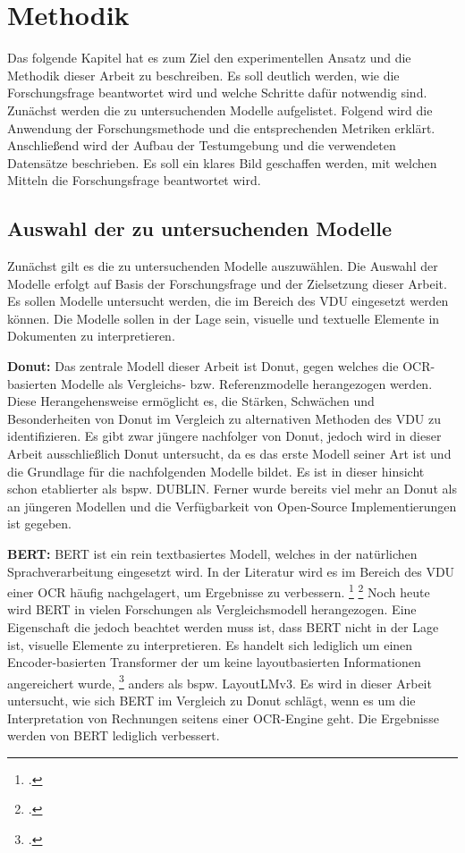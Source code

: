 \chapter{Methodik}
Das folgende Kapitel hat es zum Ziel den experimentellen Ansatz und die Methodik dieser Arbeit zu beschreiben. Es soll deutlich werden, wie die Forschungsfrage beantwortet wird und welche Schritte dafür notwendig sind. Zunächst werden die zu untersuchenden Modelle aufgelistet. Folgend wird die Anwendung der Forschungsmethode und die entsprechenden Metriken erklärt. Anschließend wird der Aufbau der Testumgebung und die verwendeten Datensätze beschrieben. Es soll ein klares Bild geschaffen werden, mit welchen Mitteln die Forschungsfrage beantwortet wird.

\section{Auswahl der zu untersuchenden Modelle}
Zunächst gilt es die zu untersuchenden Modelle auszuwählen. Die Auswahl der Modelle erfolgt auf Basis der Forschungsfrage und der Zielsetzung dieser Arbeit. Es sollen Modelle untersucht werden, die im Bereich des \ac{VDU} eingesetzt werden können. Die Modelle sollen in der Lage sein, visuelle und textuelle Elemente in Dokumenten zu interpretieren. 

\textbf{Donut:} Das zentrale Modell dieser Arbeit ist \ac{Donut}, gegen welches die OCR-basierten Modelle als Vergleichs- bzw. Referenzmodelle herangezogen werden. Diese Herangehensweise ermöglicht es, die Stärken, Schwächen und Besonderheiten von Donut im Vergleich zu alternativen Methoden des \ac{VDU} zu identifizieren. Es gibt zwar jüngere nachfolger von \ac{Donut}, jedoch wird in dieser Arbeit ausschließlich Donut untersucht, da es das erste Modell seiner Art ist und die Grundlage für die nachfolgenden Modelle bildet. Es ist in dieser hinsicht schon etablierter als bspw. \ac{DUBLIN}. Ferner wurde bereits viel mehr an \ac{Donut} als an jüngeren Modellen und die Verfügbarkeit von Open-Source Implementierungen ist gegeben.

\textbf{BERT:} \ac{BERT} ist ein rein textbasiertes Modell, welches in der natürlichen Sprachverarbeitung eingesetzt wird. In der Literatur wird es im Bereich des \ac{VDU} einer OCR häufig nachgelagert, um Ergebnisse zu verbessern. \footcites[Vgl. dazu ausführlich][]{nguyen_neural_2020} \footcites[Vgl. dazu ausführlich][]{jiang_evaluating_2021} Noch heute wird \ac{BERT} in vielen Forschungen als Vergleichsmodell herangezogen. Eine Eigenschaft die jedoch beachtet werden muss ist, dass \ac{BERT} nicht in der Lage ist, visuelle Elemente zu interpretieren. Es handelt sich lediglich um einen Encoder-basierten Transformer der um keine layoutbasierten Informationen angereichert wurde, \footcites[Vgl. dazu ausführlich][]{devlin_bert_2018} anders als bspw. LayoutLMv3. Es wird in dieser Arbeit untersucht, wie sich \ac{BERT} im Vergleich zu Donut schlägt, wenn es um die Interpretation von Rechnungen seitens einer OCR-Engine geht. Die Ergebnisse werden von BERT lediglich verbessert.

